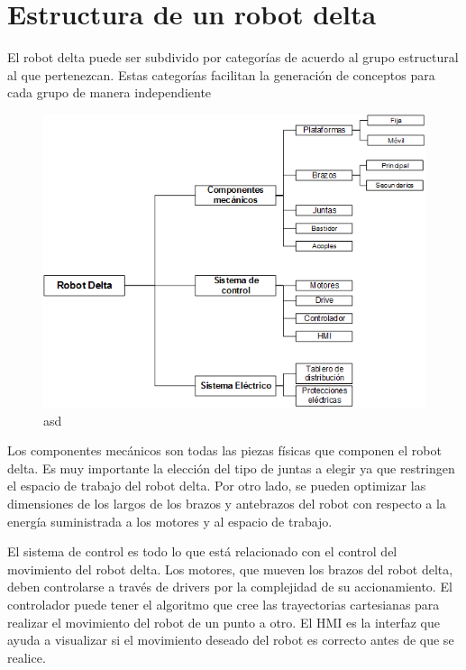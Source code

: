 \section{Estructura de un robot delta}

    El robot delta puede ser subdivido por categorías de acuerdo al grupo estructural al que pertenezcan. Estas categorías facilitan la generación de conceptos para cada grupo de manera independiente \cite{Robot_parelelo_tipo}
    
    \begin{figure}[htb]
        \centering
        \includegraphics[width=1\linewidth]{Main/Chapter3/Images3/3-2/esquema-categorias-estructura.png}
        \caption{asd}
        \label{f:Cap3-2_esquema_arquitectura_robot_delta}
    \end{figure}
    
    Los componentes mecánicos son todas las piezas físicas que componen el robot delta. Es muy importante la elección del tipo de juntas a elegir ya que restringen el espacio de trabajo del robot delta. Por otro lado, se pueden optimizar las dimensiones de los largos de los brazos y antebrazos del robot con respecto a la energía suministrada a los motores y al espacio de trabajo.
    
    El sistema de control es todo lo que está relacionado con el control del movimiento del robot delta. Los motores, que mueven los brazos del robot delta, deben controlarse a través de drivers por la complejidad de su accionamiento. El controlador puede tener el algoritmo que cree las trayectorias cartesianas para realizar el movimiento del robot de un punto a otro. El HMI es la interfaz que ayuda a visualizar si el movimiento deseado del robot es correcto antes de que se realice.
    
